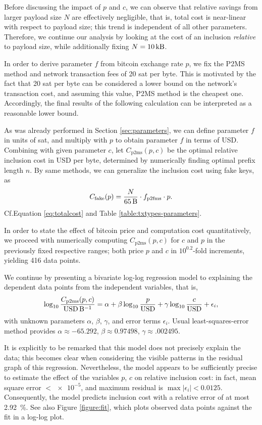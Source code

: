 \documentclass[a4paper,11pt,titlepage]{scrbook}
\begin{document}
Before discussing the impact of $p$ and $c$, we can observe that relative savings from larger payload size $N$ are effectively negligible, that is, total cost is near-linear with respect to payload size;
this trend is independent of all other parameters.
Therefore, we continue our analysis by looking at the cost of an inclusion \emph{relative} to payload size, while additionally fixing $N=\SI{10}{\kilo\byte}$.

In order to derive parameter $f$ from bitcoin exchange rate $p$, we fix the P2MS method and network transaction fees of 20 sat per byte.
This is motivated by the fact that 20 sat per byte can be considered a lower bound on the network's transaction cost, and assuming this value, P2MS method is the cheapest one.
Accordingly, the final results of the following calculation can be interpreted as a reasonable lower bound.

As was already performed in Section \ref{sec:parameters}, we can define parameter $f$ in units of sat, and multiply with $p$ to obtain parameter $f$ in terms of USD.
Combining with given parameter $c$, let $C_\text{p2ms}(p,c)$ be the optimal relative inclusion cost in USD per byte, determined by numerically finding optimal prefix length $n$.
By same methods, we can generalize the inclusion cost using fake keys, as
\[ C_\text{fake}(p) = \frac{N}{\SI{65}{\byte}} \cdot f_\text{p2fms} \cdot p. \]
Cf.\@ Equation \ref{eq:totalcost} and Table \ref{table:txtypes-parameters}.

In order to state the effect of bitcoin price and computation cost quantitatively, we proceed with numerically computing $C_\text{p2ms}(p,c)$ for $c$ and $p$ in the previously fixed respective ranges; both price $p$ and $c$ in $10^{0.2}$-fold increments, yielding 416 data points.

We continue by presenting a bivariate log-log regression model to explaining the dependent data points from the independent variables, that is,
\begin{equation} \log_{10} \frac{C_\text{p2ms}(p, c)}{\text{USD}\,\si{\per\byte}} = \alpha + \beta \log_{10} \frac{p}{\text{USD}} + \gamma \log_{10} \frac{c}{\text{USD}} + \epsilon_i, \label{eq:regressionmodel}\end{equation}
with unknown parameters $\alpha$, $\beta$, $\gamma$, and error terms $\epsilon_i$.
Usual least-squares-error method provides $\alpha \approx \num{-65.292}$, $\beta \approx\num{0.97498}$, $\gamma \approx\num{.002495}$.


It is explicitly to be remarked that this model does not precisely explain the data; this becomes clear when considering the visible patterns in the residual graph of this regression.
Nevertheless, the model appears to be sufficiently precise to estimate the effect of the variables $p$, $c$ on relative inclusion cost: in fact, mean square error $< \num{e-5}$, and maximum residual is $\max |\epsilon_i| < 0.0125$. Consequently, the model predicts inclusion cost with a relative error of at most \SI{2.92}{\percent}.
See also Figure \ref{figure:fit}, which plots observed data points against the fit in a log-log plot.
\end{document}

